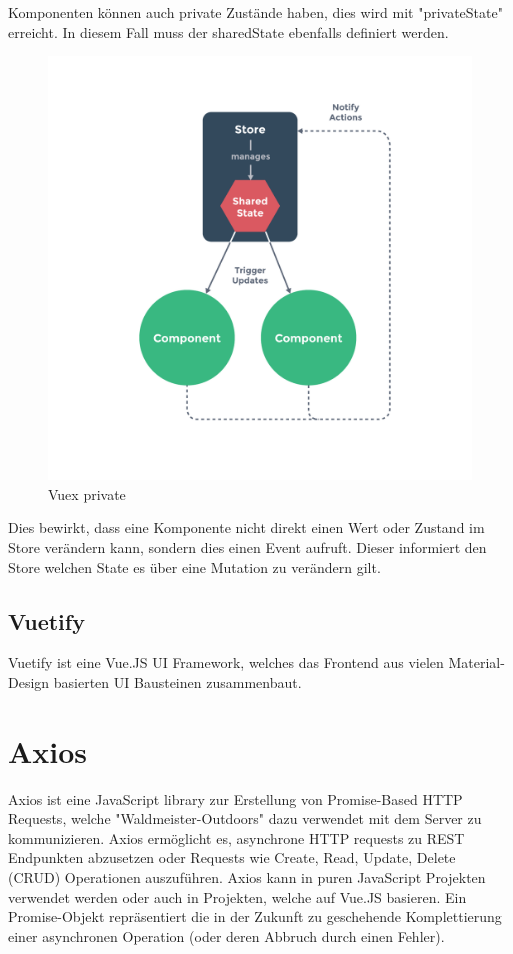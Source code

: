 Komponenten k\"onnen auch private Zust\"ande haben, dies wird mit "privateState" erreicht. In diesem Fall muss der sharedState ebenfalls definiert werden.

\begin{figure}[H]
    \centering
    \includegraphics[width=1.25\textwidth]{sharedstate}
    \caption{Vuex private}
    \label{fig:mesh2}
\end{figure}

Dies bewirkt, dass eine Komponente nicht direkt einen Wert oder Zustand im Store ver\"andern kann, sondern dies einen Event aufruft. Dieser informiert den Store welchen State es \"uber eine Mutation zu ver\"andern gilt.


\subsection{Vuetify}
Vuetify ist eine Vue.JS UI Framework, welches das Frontend aus vielen Material-Design basierten UI Bausteinen zusammenbaut.

\section{Axios}
Axios ist eine JavaScript library zur Erstellung von Promise-Based HTTP Requests, welche "Waldmeister-Outdoors" dazu verwendet mit dem Server zu kommunizieren. Axios erm\"oglicht es, asynchrone HTTP requests zu REST Endpunkten abzusetzen oder Requests wie Create, Read, Update, Delete (CRUD) Operationen auszuf\"uhren. Axios kann in puren JavaScript Projekten verwendet werden oder auch in Projekten, welche auf Vue.JS basieren. Ein Promise-Objekt repr\"asentiert die in der Zukunft zu geschehende Komplettierung einer asynchronen Operation (oder deren Abbruch durch einen Fehler).

